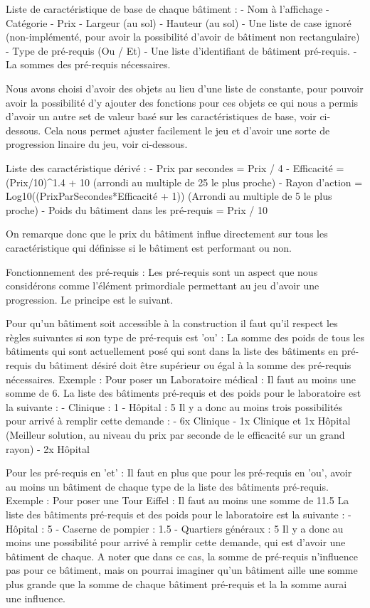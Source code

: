 \documentclass[a4paper,10pt,openany,oneside]{book}
\begin{document}
Liste de caractéristique de base de chaque bâtiment :
- Nom à l'affichage
- Catégorie
- Prix
- Largeur (au sol)
- Hauteur (au sol)
- Une liste de case ignoré (non-implémenté, pour avoir la possibilité d'avoir de bâtiment non rectangulaire)
- Type de pré-requis (Ou / Et)
- Une liste d'identifiant de bâtiment pré-requis.
- La sommes des pré-requis nécessaires.

Nous avons choisi d'avoir des objets au lieu d'une liste de constante, pour pouvoir avoir la possibilité d'y ajouter des fonctions pour ces objets ce qui nous a permis d'avoir un autre set de valeur basé sur les caractéristiques de base, voir ci-dessous. Cela nous permet ajuster facilement le jeu et d'avoir une sorte de progression linaire du jeu, voir ci-dessous.

Liste des caractéristique dérivé :
- Prix par secondes = Prix / 4
- Efficacité = (Prix/10)^1.4 + 10 (arrondi au multiple de 25 le plus proche)
- Rayon d'action = Log10((PrixParSecondes*Efficacité + 1)) (Arrondi au multiple de 5 le plus proche)
- Poids du bâtiment dans les pré-requis = Prix / 10

On remarque donc que le prix du bâtiment influe directement sur tous les caractéristique qui définisse si le bâtiment est performant ou non.

Fonctionnement des pré-requis :
Les pré-requis sont un aspect que nous considérons comme l'élément primordiale permettant au jeu d'avoir une progression. Le principe est le suivant.

Pour qu'un bâtiment soit accessible à la construction il faut qu'il respect les règles suivantes si son type de pré-requis est 'ou' :
La somme des poids de tous les bâtiments qui sont actuellement posé qui sont dans la liste des bâtiments en pré-requis du bâtiment désiré doit être supérieur ou égal à la somme des pré-requis nécessaires.
Exemple :
Pour poser un Laboratoire médical : Il faut au moins une somme de 6.
La liste des bâtiments pré-requis et des poids pour le laboratoire est la suivante :
	- Clinique : 1
	- Hôpital : 5
Il y a donc au moins trois possibilités pour arrivé à remplir cette demande :
	- 6x Clinique
	- 1x Clinique et 1x Hôpital (Meilleur solution, au niveau du prix par seconde de le efficacité sur un grand rayon)
	- 2x Hôpital

Pour les pré-requis en 'et' :
Il faut en plus que pour les pré-requis en 'ou', avoir au moins un bâtiment de chaque type de la liste des bâtiments pré-requis.
Exemple :
Pour poser une Tour Eiffel : Il faut au moins une somme de 11.5
La liste des bâtiments pré-requis et des poids pour le laboratoire est la suivante :
	- Hôpital : 5
	- Caserne de pompier : 1.5
	- Quartiers généraux : 5
Il y a donc au moins une possibilité pour arrivé à remplir cette demande, qui est d'avoir une bâtiment de chaque. A noter que dans ce cas, la somme de pré-requis n'influence pas pour ce bâtiment, mais on pourrai imaginer qu'un bâtiment aille une somme plus grande que la somme de chaque bâtiment pré-requis et la la somme aurai une influence.
	
\end{document}
